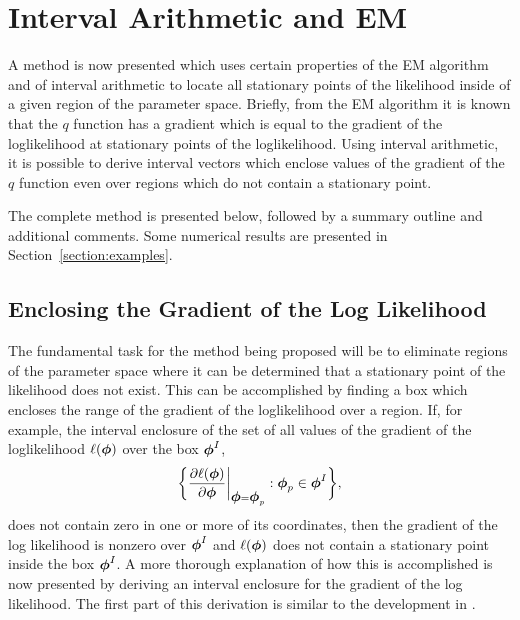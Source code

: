 \section{Interval Arithmetic and EM}\label{section:interval_em}

A method is now presented which uses certain properties of the EM
algorithm and of interval arithmetic to locate all stationary points of
the likelihood inside of a given region of the parameter space.
Briefly, from the EM algorithm it is known that the $q$
function has a gradient which is equal to the gradient of the
loglikelihood at stationary points of the loglikelihood.  Using
interval arithmetic, it is possible to derive interval vectors which 
enclose values of the
gradient of the $q$ function even over regions which do not contain
a stationary point.

The complete method is presented below,
followed by a summary outline and additional comments.  
Some numerical results are presented in
Section~\ref{section:examples}.

\subsection{Enclosing the Gradient of the Log Likelihood}

The fundamental task for the 
method being proposed will be to eliminate regions of the parameter
space where it can be determined that a stationary point of the likelihood
does not exist.  This can be accomplished by finding a box which encloses the
range of the gradient of the
loglikelihood over a region.  
If, for example, the interval enclosure of the set of all values of the
gradient of the loglikelihood $\ell(\mbox{\boldmath $\phi$})$ over the box $\mbox{\boldmath $\phi$}^I$,
$$
\bigg\{ \frac{\partial\ell(\mbox{\boldmath $\phi$})}{\partial\mbox{\boldmath $\phi$}} 
  \bigg|_{\mbox{\boldmath $\phi$} = \mbox{\boldmath $\phi$}_p} : \mbox{\boldmath $\phi$}_p \in \mbox{\boldmath $\phi$}^I \bigg\},
$$
does not contain zero in one or more of its coordinates,
then the gradient of the log likelihood is nonzero over $\mbox{\boldmath $\phi$}^I$ and 
$\ell(\mbox{\boldmath $\phi$})$ does not contain a stationary point
inside the box $\mbox{\boldmath $\phi$}^I$.
A more thorough explanation of how this is
accomplished is now presented by deriving an interval
enclosure for the gradient of the
log likelihood.  The first part of this derivation is similar to the
development in \cite{DLR}.

